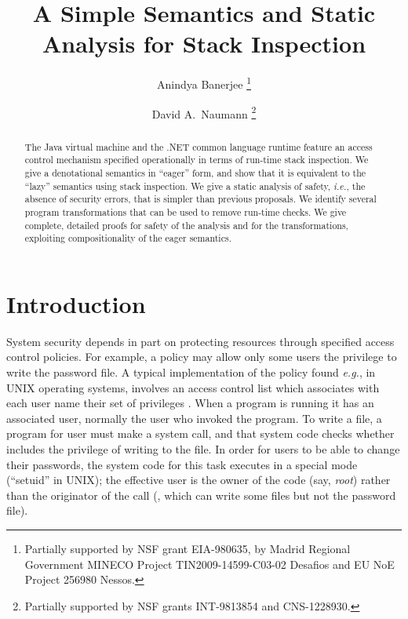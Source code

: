 \documentclass[submission,copyright,creativecommons]{eptcs}
\title{A Simple Semantics and Static Analysis for Stack Inspection}
\author{Anindya Banerjee 
\institute{IMDEA Software Institute\\ Madrid, Spain}\thanks{Partially 
supported by NSF grant EIA-980635, by Madrid Regional Government MINECO Project TIN2009-14599-C03-02 Desafios and EU NoE Project 256980 Nessos.
}
\email{anindya.banerjee@imdea.org}
\and
David A.~Naumann
\institute{Stevens Institute of Technology\\ Hoboken, NJ 07030, USA}\thanks{Partially supported by NSF grants INT-9813854 and CNS-1228930.}
\email{naumann@cs.stevens.edu}
}
\newcommand{\ie}{{\em i.e.}}
\newcommand{\eg}{{\em e.g.}}
\begin{document}
\maketitle

\begin{abstract}
The Java virtual machine and the .NET common language runtime feature an access control mechanism specified operationally in
terms of run-time stack inspection.
We give a denotational semantics in ``eager'' form, and show that it is equivalent to
the ``lazy'' semantics using stack inspection.  
We give a static analysis of safety, \ie, the absence of security errors,
that is simpler than previous proposals.   
We identify several program transformations that can be used to remove run-time
checks.  We give complete, detailed proofs for safety of the analysis and for the
transformations, exploiting compositionality of the eager semantics.
\end{abstract}



\section{Introduction}
\label{sec:intro}

System security depends in part on protecting resources through
specified access control policies. For example, a policy may allow
only some users the privilege to write the password file.  A typical
implementation of the policy found \eg, in UNIX operating systems,
involves an access control list  which associates with each user
name  their set of privileges .  When a program is running
it has an associated user, normally the user who invoked the program.
To write a file, a program for user  must make a system call, and
that system code checks whether  includes the privilege of
writing to the file. In order for users to be able to change their
passwords, the system code for this task executes in a special mode
(``setuid'' in UNIX); the effective user is the owner of the code
(say, \textit{root}) rather than the originator of the call (,
which can write some files but not the password file).
\end{document}
